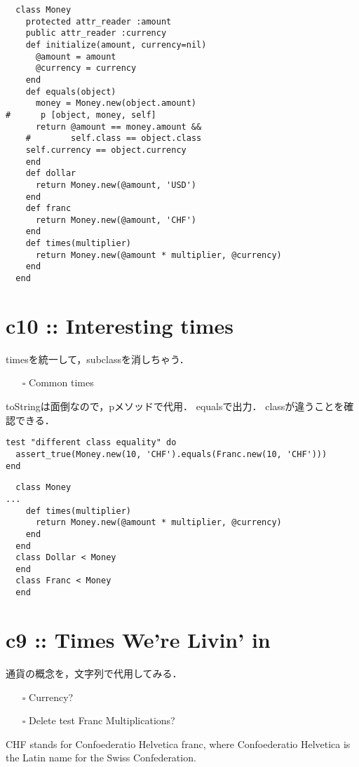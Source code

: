 \documentclass[11pt]{article}
\begin{document}
\begin{verbatim}
  class Money
    protected attr_reader :amount
    public attr_reader :currency
    def initialize(amount, currency=nil)
      @amount = amount
      @currency = currency
    end
    def equals(object)
      money = Money.new(object.amount)
#      p [object, money, self]
      return @amount == money.amount &&
	#        self.class == object.class
	self.currency == object.currency
    end
    def dollar
      return Money.new(@amount, 'USD')
    end
    def franc
      return Money.new(@amount, 'CHF')
    end
    def times(multiplier)
      return Money.new(@amount * multiplier, @currency)
    end
  end
\end{verbatim}
\section{c10 :: Interesting times}
\label{sec:orgbf12f7e}
timesを統一して，subclassを消しちゃう．
\begin{itemize}
\item[{$\square$}] Common times
\end{itemize}

toStringは面倒なので，pメソッドで代用．
equalsで出力．
classが違うことを確認できる．

\begin{verbatim}
test "different class equality" do
  assert_true(Money.new(10, 'CHF').equals(Franc.new(10, 'CHF')))
end
\end{verbatim}

\begin{verbatim}
  class Money
...
    def times(multiplier)
      return Money.new(@amount * multiplier, @currency)
    end
  end
  class Dollar < Money
  end
  class Franc < Money
  end
\end{verbatim}

\section{c9 :: Times We're Livin' in}
\label{sec:org002644c}
通貨の概念を，文字列で代用してみる．
\begin{itemize}
\item[{$\square$}] Currency?
\item[{$\square$}] Delete test Franc Multiplications?
\end{itemize}

CHF stands for Confoederatio Helvetica franc, 
where Confoederatio Helvetica is the Latin name for 
the Swiss Confederation.
\end{document}
